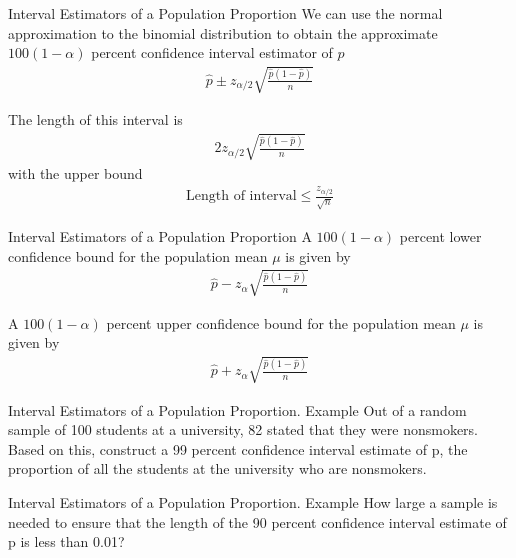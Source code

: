 \documentclass{beamer}
\begin{document}
\begin{frame}{Interval Estimators of a Population Proportion}
  We can use the normal approximation to the binomial distribution to obtain the
  approximate $100(1-\alpha)$ percent confidence interval estimator of $p$
  \begin{align*}
    \hat{p} \pm z_{\alpha/2}\sqrt{\frac{\hat{p}(1-\hat{p})}{n}}
  \end{align*}

  The length of this interval is
  \begin{align*}
    2z_{\alpha/2}\sqrt{\frac{\hat{p}(1-\hat{p})}{n}}
  \end{align*}
  with the upper bound
  \begin{align*}
    \text{Length of interval} \leq \frac{z_{\alpha/2}}{\sqrt{n}}
  \end{align*}
\end{frame}

\begin{frame}{Interval Estimators of a Population Proportion}
  A $100(1 - \alpha)$ percent lower confidence bound for the population mean
  $\mu$ is given by
  \begin{align*}
    \hat{p} - z_{\alpha}\sqrt{\frac{\hat{p}(1-\hat{p})}{n}}
  \end{align*}

  A $100(1 - \alpha)$ percent upper confidence bound for the population mean
  $\mu$ is given by
  \begin{align*}
    \hat{p} + z_{\alpha}\sqrt{\frac{\hat{p}(1-\hat{p})}{n}}
  \end{align*}
\end{frame}

\begin{frame}[t]{Interval Estimators of a Population Proportion. Example}
  Out of a random sample of 100 students at a university, 82 stated that they
  were nonsmokers. Based on this, construct a 99 percent confidence interval
  estimate of p, the proportion of all the students at the university who are
  nonsmokers.
\end{frame}

\begin{frame}[t]{Interval Estimators of a Population Proportion. Example}
  How large a sample is needed to ensure that the length of the 90 percent
  confidence interval estimate of p is less than 0.01?
\end{frame}
\end{document}
